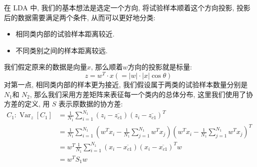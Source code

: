 在 LDA 中, 我们的基本想法是选定一个方向, 将试验样本顺着这个方向投影, 投影后的数据需要满足两个条件, 从而可以更好地分类:
\begin{itemize}
	\item 相同类内部的试验样本距离较近.
	\item 不同类别之间的样本距离较远. 
\end{itemize}
我们假定原来的数据是向量$x$, 那么顺着$w$方向的投影就是标量: 
\begin{equation}
z=w^{T} \cdot x(=|w| \cdot|x| \cos \theta)
\end{equation}
对第一点, 相同类内部的样本更为接近, 我们假设属于两类的试验样本数量分别是 $N_1$和 $N_2$, 那么我们采用方差矩阵来表征每一个类内的总体分布, 这里我们使用了协方差的定义, 用 $S$ 表示原数据的协方差:
\begin{equation}
\begin{aligned}
C_{1}: \operatorname{Var}_{z}\left[C_{1}\right] & =\frac{1}{N_{1}} \sum_{i=1}^{N_{1}}\left(z_{i}-\overline{z_{c 1}}\right)\left(z_{i}-\overline{z_{c 1}}\right)^{T} \\
& =\frac{1}{N_{1}} \sum_{i=1}^{N_{1}}\left(w^{T} x_{i}-\frac{1}{N_{1}} \sum_{j=1}^{N_{1}} w^{T} x_{j}\right)\left(w^{T} x_{i}-\frac{1}{N_{1}} \sum_{j=1}^{N_{1}} w^{T} x_{j}\right)^{T} \\
& =w^{T} \frac{1}{N_{1}} \sum_{i=1}^{N_{1}}\left(x_{i}-\overline{x_{c 1}}\right)\left(x_{i}-\overline{x_{c 1}}\right)^{T} w \\
& =w^{T} S_{1} w
\end{aligned}
\end{equation}

